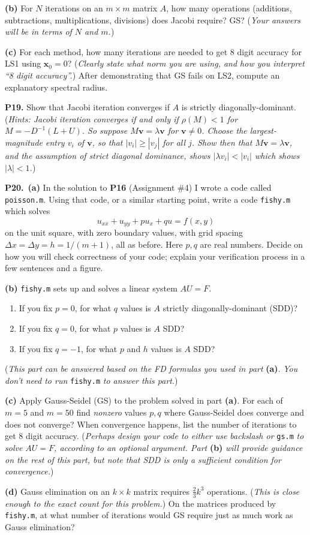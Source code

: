 \documentclass[12pt]{amsart}
\newcommand{\bv}{\mathbf{v}}
\newcommand{\bx}{\mathbf{x}}
\newcommand{\prob}[1]{\bigskip\noindent\textbf{#1.}\quad }
\newcommand{\epart}[1]{\medskip\noindent\textbf{(#1)}\quad }
\newcommand{\ppart}[1]{\,\textbf{(#1)}\quad }
\begin{document}
\epart{b}  For $N$ iterations on an $m\times m$ matrix $A$, how many operations (additions, subtractions, multiplications, divisions) does Jacobi require?  GS?  (\emph{Your answers will be in terms of $N$ and $m$.})

\epart{c}  For each method, how many iterations are needed to get 8 digit accuracy for LS1 using $\bx_0=0$?  (\emph{Clearly state what norm you are using, and how you interpret ``8 digit accuracy''.})  After demonstrating that GS fails on LS2, compute an explanatory spectral radius.


\clearpage \newpage
\prob{P19}  Show that Jacobi iteration converges if $A$ is strictly diagonally-dominant.  (\emph{Hints:  Jacobi iteration converges if and only if $\rho(M) < 1$ for $M = - D^{-1}(L+U)$.  So suppose $M\bv = \lambda \bv$ for $\bv\ne 0$.  Choose the largest-magnitude entry $v_i$ of $\bv$, so that $|v_i| \ge |v_j|$ for all $j$.  Show then that $M\bv=\lambda\bv$, and the assumption of strict diagonal dominance, shows $|\lambda v_i| < |v_i|$ which shows $|\lambda|<1$.})


\prob{P20}  \ppart{a}  In the solution to \textbf{P16} (Assignment \#4) I wrote a code called \texttt{poisson.m}.  Using that code, or a similar starting point, write a code \texttt{fishy.m} which solves
    $$u_{xx} + u_{yy} + p u_x + q u = f(x,y)$$
on the unit square, with zero boundary values, with grid spacing $\Delta x=\Delta y = h = 1/(m+1)$, all as before.  Here $p,q$ are real numbers.  Decide on how you will check correctness of your code; explain your verification process in a few sentences and a figure.

\epart{b}  \texttt{fishy.m} sets up and solves a linear system $AU=F$.\renewcommand{\labelenumi}{\emph{\roman{enumi}})}
\begin{enumerate}
\item If you fix $p=0$, for what $q$ values is $A$ strictly diagonally-dominant (SDD)?
\item If you fix $q=0$, for what $p$ values is $A$ SDD?
\item If you fix $q=-1$, for what $p$ and $h$ values is $A$ SDD?
\end{enumerate}
(\emph{This part can be answered based on the FD formulas you used in part} \textbf{(a)}.  \emph{You don't need to run} \texttt{fishy.m} \emph{to answer this part}.)

\epart{c}  Apply Gauss-Seidel (GS) to the problem solved in part \textbf{(a)}.  For each of $m=5$ and $m=50$ find \emph{nonzero} values $p,q$ where Gauss-Seidel does converge and does not converge?  When convergence happens, list the number of iterations to get 8 digit accuracy.  (\emph{Perhaps design your code to either use backslash or} \texttt{gs.m} \emph{to solve $AU=F$, according to an optional argument.  Part} \textbf{(b)} \emph{will provide guidance on the rest of this part, but note that SDD is only a \emph{sufficient} condition for convergence.})

\epart{d}  Gauss elimination on an $k\times k$ matrix requires $\frac{2}{3} k^3$ operations.  (\emph{This is close enough to the exact count for this problem.})  On the matrices produced by \texttt{fishy.m}, at what number of iterations would GS require just as much work as Gauss elimination?
\end{document}
